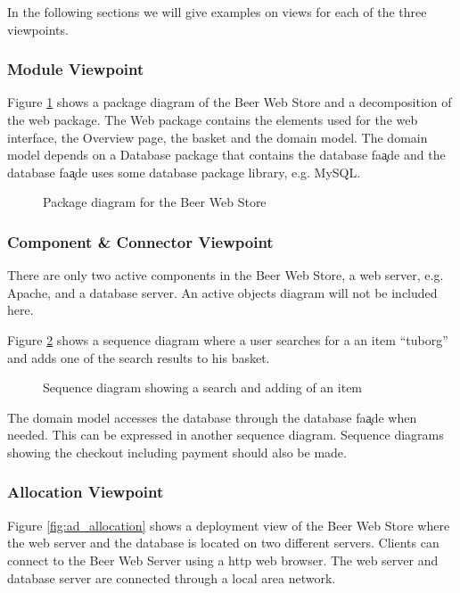 In the following sections we will give examples on views for each
of the three viewpoints.

\subsubsection{Module Viewpoint}

Figure \ref{fig:ad_package} shows a package diagram of the Beer Web
Store and a decomposition of the web package. The Web package
contains the elements used for the web interface, 
the Overview page, the basket and the domain model. The domain model
depends on a Database package that contains the database fa\c ade and the
database fa\c ade uses some database package library, e.g. MySQL.

\begin{figure}[!htb]
\centerline{}
\caption{Package diagram for the Beer Web Store}
\label{fig:ad_package}
\end{figure}

\subsubsection{Component \& Connector Viewpoint}

There are only two active components in the Beer Web Store, a web server,
e.g. Apache, and a database server. An active objects diagram will
not be included here.

Figure \ref{fig:ad_sequence} shows a sequence diagram where a user searches
for a an item ``tuborg'' and adds one of the search results to his basket.

\begin{figure}[!htb]
\centerline{}
\caption{Sequence diagram showing a search and adding of an item}
\label{fig:ad_sequence}
\end{figure}

The domain model accesses the database through the database fa\c ade
when needed. This can be expressed in another sequence diagram.
Sequence diagrams showing the checkout including payment should
also be made.

\subsubsection{Allocation Viewpoint}

Figure \ref{fig:ad_allocation} shows a deployment view of the Beer
Web Store where the web server and the database is located on two
different servers. Clients can connect to the Beer Web Server
using a http web browser. The web server and database server
are connected through a local area network.

